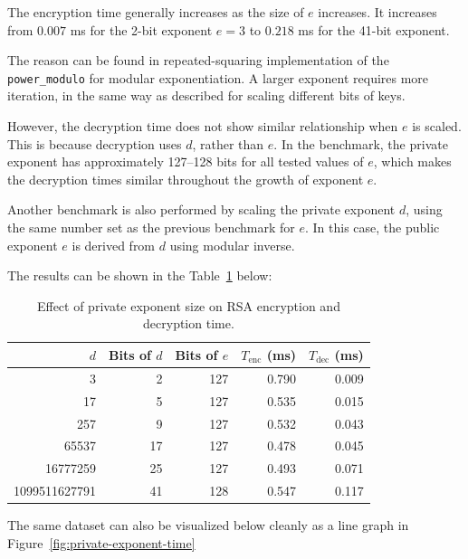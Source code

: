\documentclass[11pt,a4paper]{article}
\begin{document}
The encryption time generally increases as the size of $e$ increases. It increases from $0.007$ ms for the 2-bit exponent $e=3$ to $0.218$ ms for the 41-bit exponent.

The reason can be found in repeated-squaring implementation of the \texttt{power\_modulo} for modular exponentiation. A larger exponent requires more iteration, in the same way as described for scaling different bits of keys.

However, the decryption time does not show similar relationship when $e$ is scaled. This is because decryption uses $d$, rather than $e$. In the benchmark, the private exponent has approximately 127--128 bits for all tested values of $e$, which makes the decryption times similar throughout the growth of exponent $e$.

Another benchmark is also performed by scaling the private exponent $d$, using the same number set as the previous benchmark for $e$. In this case, the public exponent $e$ is derived from $d$ using modular inverse.

The results can be shown in the Table~\ref{tab:private-exponent-scale} below:

\begin{table}[ht]
    \centering
    \caption{Effect of private exponent size on RSA encryption and decryption time.}
    \label{tab:private-exponent-scale}
    \begin{tabular}{rrrrr}
        \toprule
        $d$ & Bits of $d$ & Bits of $e$ &
        $T_{\mathrm{enc}}$ (ms) & $T_{\mathrm{dec}}$ (ms) \\
        \midrule
        3             & 2  & 127 & 0.790 & 0.009 \\
        17            & 5  & 127 & 0.535 & 0.015 \\
        257           & 9  & 127 & 0.532 & 0.043 \\
        65537         & 17 & 127 & 0.478 & 0.045 \\
        16777259      & 25 & 127 & 0.493 & 0.071 \\
        1099511627791 & 41 & 128 & 0.547 & 0.117 \\
        \bottomrule
    \end{tabular}
\end{table}

The same dataset can also be visualized below cleanly as a line graph in Figure~\ref{fig:private-exponent-time}
\end{document}
